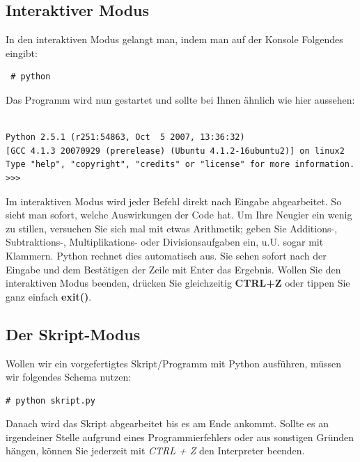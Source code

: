 \documentclass[b5paper,10pt,dvips,fleqn,titlepage,twoside]{book}
\begin{document}
\subsection{Interaktiver Modus}
In den interaktiven Modus gelangt man, indem man auf der Konsole Folgendes eingibt:
\begin{lstlisting}
 # python
\end{lstlisting}
Das Programm wird nun gestartet und sollte bei Ihnen ähnlich wie hier aussehen:
\begin{lstlisting}

Python 2.5.1 (r251:54863, Oct  5 2007, 13:36:32) 
[GCC 4.1.3 20070929 (prerelease) (Ubuntu 4.1.2-16ubuntu2)] on linux2
Type "help", "copyright", "credits" or "license" for more information.
>>> 
\end{lstlisting}
Im interaktiven Modus wird jeder Befehl direkt nach Eingabe abgearbeitet. So sieht man sofort, welche Auswirkungen der Code hat.
Um Ihre Neugier ein wenig zu stillen, versuchen Sie sich mal mit etwas Arithmetik; geben Sie Additions-, Subtraktions-, Multiplikations- oder Divisionsaufgaben ein, u.U. sogar mit Klammern. Python rechnet dies automatisch aus. Sie sehen sofort nach der Eingabe und dem Bestätigen der Zeile mit Enter das Ergebnis.\newline
Wollen Sie den interaktiven Modus beenden, drücken Sie gleichzeitig \textbf{CTRL+Z} oder tippen Sie ganz einfach \textbf{exit()}.
\subsection{Der Skript-Modus}
Wollen wir ein vorgefertigtes Skript/Programm mit Python ausführen, müssen wir folgendes Schema nutzen:
\begin{lstlisting}
# python skript.py
\end{lstlisting}
Danach wird das Skript abgearbeitet bis es am Ende ankommt. Sollte es an irgendeiner Stelle aufgrund eines Programmierfehlers oder aus sonstigen Gründen hängen, können Sie jederzeit mit \emph{CTRL + Z} den Interpreter beenden.\newline
\end{document}
